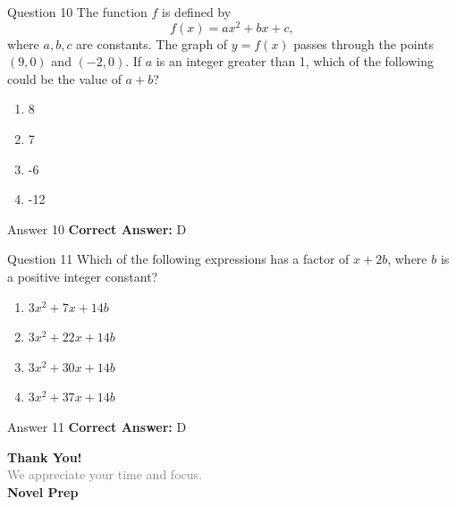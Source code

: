 \documentclass{beamer}
\begin{document}
\begin{frame}{Question 10}
\small
The function \(f\) is defined by
\[
f(x) = ax^2 + bx + c,
\]
where \(a, b, c\) are constants. The graph of \(y = f(x)\) passes through the points \((9, 0)\) and \((-2, 0)\). If \(a\) is an integer greater than 1, which of the following could be the value of \(a + b\)?
\vspace{0.35cm}
\begin{enumerate}
    \item[A.] 8
    \item[B.] 7
    \item[C.] -6
    \item[D.] -12
\end{enumerate}
\end{frame}
\begin{frame}{Answer 10}
\small
\textbf{Correct Answer:} D
\end{frame}

\begin{frame}{Question 11}
\small
Which of the following expressions has a factor of \(x + 2b\), where \(b\) is a positive integer constant?
\vspace{0.35cm}
\begin{enumerate}
    \item[A.] \(3x^2 + 7x + 14b\)
    \item[B.] \(3x^2 + 22x + 14b\)
    \item[C.] \(3x^2 + 30x + 14b\)
    \item[D.] \(3x^2 + 37x + 14b\)
\end{enumerate}
\end{frame}
\begin{frame}{Answer 11}
\small
\textbf{Correct Answer:} D
\end{frame}

\begin{frame}{}
    \centering
    \vspace{5em}
    {\Huge \textbf{\textcolor{novelPurple}{Thank You!}}} \\[1em]
    {\large \textcolor{gray}{We appreciate your time and focus.}} \\[3em]
    {\LARGE \textbf{\textcolor{novelPurple}{\textsf{Novel Prep}}}}
    \vfill
\end{frame}
\end{document}
